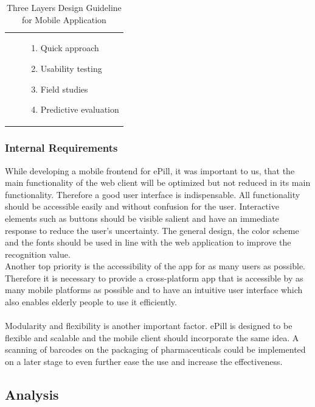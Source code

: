 \begin{table}[!htb]
\begin{tabular}{c | c | p{23.5em}}
        \cline{3-3}
        & & 
            \begin{enumerate}
                \item Quick approach
                \item Usability testing
                \item Field studies
                \item Predictive evaluation
            \end{enumerate}
        \\
    \end{tabular}
    \caption[Three Layers Design Guideline for Mobile Application]{Three Layers Design Guideline for Mobile Application\footnotemark}
    \label{tab:ThreeLayersDesignGuideline}
\end{table}

\subsubsection{Internal Requirements}
While developing a mobile frontend for ePill, it was important to us, that the main functionality of the web client will be optimized but not reduced in its main functionality. Therefore a good user interface is indispensable. All functionality should be accessible easily and without confusion for the user. Interactive elements such as buttons should be visible salient and have an immediate response to reduce the user's uncertainty. The general design, the color scheme and the fonts should be used in line with the web application to improve the recognition value.
\\
Another top priority is the accessibility of the app for as many users as possible. Therefore it is necessary to provide a cross-platform app that is accessible by as many mobile platforms as possible and to have an intuitive user interface which also enables elderly people to use it efficiently.
\\
\\
Modularity and flexibility is another important factor. ePill is designed to be flexible and scalable and the mobile client should incorporate the same idea. A scanning of barcodes on the packaging of pharmaceuticals could be implemented on a later stage to even further ease the use and increase the effectiveness.
\subsection{Analysis}
\label{subsec:Analysis}
